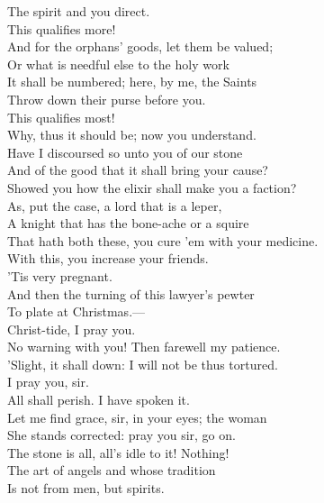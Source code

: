 \documentclass[a4paper,oneside,12pt]{memoir}
\begin{document}
\begin{drama*}
The spirit and you direct.\\
\subtlespeaks {} This qualifies more!\\
\tribulationspeaks And for the orphans' goods, let them be valued;\\
Or what is needful else to the holy work\\
It shall be numbered; here, by me, the Saints\\
Throw down their purse before you.\\
\subtlespeaks {} This qualifies most!\\
Why, thus it should be; now you understand.\\
Have I discoursed so unto you of our stone\\
And of the good that it shall bring your cause?\\
Showed you how the elixir shall make you a faction?\\
As, put the case, a lord that is a leper,\\
A knight that has the bone-ache or a squire\\
That hath both these, you cure 'em with your medicine.\\
With this, you increase your friends.\\
\tribulationspeaks {} 'Tis very pregnant.\\
\subtlespeaks And then the turning of this lawyer's pewter\\
To plate at Christmas.---\\
\persecutionspeaks {} Christ-tide, I pray you.\\
\subtlespeaks No warning with you! Then farewell my patience.\\
'Slight, it shall down: I will not be thus tortured.\\
\tribulationspeaks I pray you, sir.\\
\subtlespeaks {} All shall perish. I have spoken it.\\
\tribulationspeaks Let me find grace, sir, in your eyes; the woman\\
She stands corrected: pray you sir, go on.\\
\subtlespeaks The stone is all, all's idle to it! Nothing!\\
The art of angels and whose tradition\\
Is not from men, but spirits.\\

\end{drama*}
\end{document}
